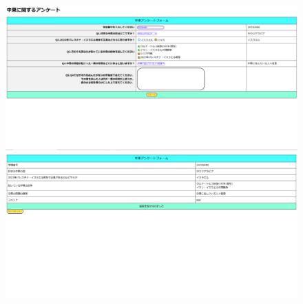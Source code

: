 \documentclass[titlepage,a4paper]{jsarticle}
\begin{document}
\begin{figure}[H]
  \centering
  \begin{minipage}[t]{0.45\textwidth}
    \centering
    \includegraphics[width=\textwidth]{img/move/web1.png}  %
  \end{minipage}
  \hfill
  \begin{minipage}[t]{0.45\textwidth}
    \centering
    \includegraphics[width=\textwidth]{img/move/web2.png}  %
  \end{minipage}

  \vspace{0.5cm}  %


\end{figure}
\end{document}
